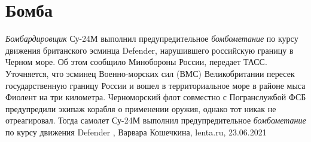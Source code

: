  
 
 
 
 
\chapter{Бомба}

\emph{Бомбардировщик} Су-24М выполнил предупредительное \emph{бомбометание} по курсу движения
британского эсминца Defender, нарушившего российскую границу в Черном море. Об
этом сообщило Минобороны России, передает ТАСС.  Уточняется, что эсминец
Военно-морских сил (ВМС) Великобритании пересек государственную границу России
и вошел в территориальное море в районе мыса Фиолент на три километра.
Черноморский флот совместно с Погранслужбой ФСБ предупредили экипаж корабля о
применении оружия, однако тот никак не отреагировал. Тогда самолет Су-24М
выполнил предупредительное \emph{бомбометание} по курсу движения Defender
, 
Варвара Кошечкина, lenta.ru, 23.06.2021

